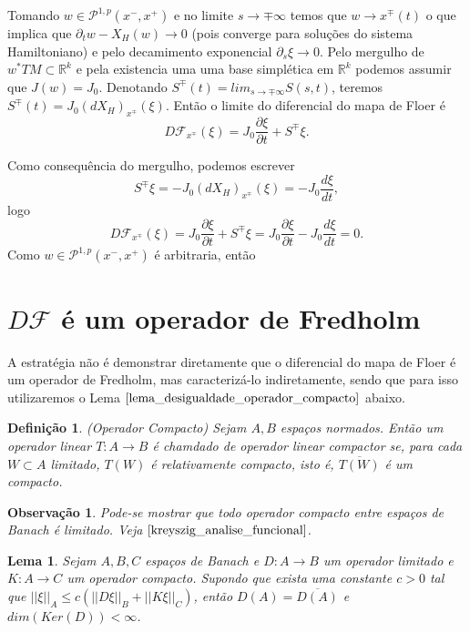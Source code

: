 \documentclass[12pt]{book}
\newtheorem{lema}[teorema]{Lema}
\newtheorem{definicao}[teorema]{Definição}
\newtheorem{observacao}[teorema]{Observação}
\newcommand{\caminhosexponenciaisconectantes}[2]{\mathcal{P}^{1,p}(#1, #2)}
\newcommand{\caminhosexponenciaisconectantespadrao}{\caminhosexponenciaisconectantes{x^{-}}{x^{+}}}
\newcommand{\campohamiltoniano}[1]{X_{H}(#1)}
\newcommand{\derivada}[2]{\frac{d #1}{d #2}}
\newcommand{\derivadaparcial}[2]{\frac{\partial #1}{\partial #2}}
\newcommand{\derivadaparcialabrev}[1]{\partial_{#1}}
\newcommand{\diferencialhamiltoniano}[1]{(dX_{H})_{#1}}
\newcommand{\estruturacomplexa}{J_{0}}
\newcommand{\mapafloer}{\mathcal{F}}
\newcommand{\norma}[1]{||#1||}
\newcommand{\normasubscrito}[2]{\norma{#1}_{#2}}
\newcommand{\pullbackfibradotangente}[2]{#1^{*}T#2}
\newcommand{\pullbackfibradotangenteM}[1]{\pullbackfibradotangente{#1}{M}}
\newcommand{\real}[1]{\mathbb{R}^{#1}}
\begin{document}
	Tomando $w\in \caminhosexponenciaisconectantespadrao$ e no limite $s\to \mp\infty$ temos que $w \to x^{\mp}(t)$ o que implica que $\derivadaparcialabrev{t}w - \campohamiltoniano{w}\to 0$ (pois converge para soluções do sistema Hamiltoniano) e pelo decamimento exponencial $\derivadaparcialabrev{s}\xi \to 0$. Pelo mergulho de $\pullbackfibradotangenteM{w} \subset \real{k}$ e pela existencia uma uma base simplética em $\real{k}$ podemos assumir que $J(w) = \estruturacomplexa$. Denotando $S^{\mp}(t) = lim_{s\to \mp \infty}S(s,t)$, teremos $S^{\mp}(t) = \estruturacomplexa\diferencialhamiltoniano{x^{\mp}}(\xi)$. Então o limite do diferencial do mapa de Floer é
	$$
	D\mapafloer_{x^{\mp}}(\xi) =  \estruturacomplexa\derivadaparcial{\xi}{t}+ S^{\mp}\xi.
	$$
	
	Como consequência do mergulho, podemos escrever
	$$
	S^{\mp}\xi = -\estruturacomplexa\diferencialhamiltoniano{x^{\mp}}(\xi) = -\estruturacomplexa\derivada{\xi}{t},
	$$
	logo
	$$
	D\mapafloer_{x^{\mp}}(\xi) =  \estruturacomplexa\derivadaparcial{\xi}{t}+ S^{\mp}\xi =
	\estruturacomplexa\derivadaparcial{\xi}{t} -\estruturacomplexa\derivada{\xi}{t}
	=0.
	$$
	Como $w \in \caminhosexponenciaisconectantespadrao$ é arbitraria, então 
	
	\section{$D\mapafloer$ é um operador de Fredholm}
	A estratégia não é demonstrar diretamente que o diferencial do mapa de Floer é um operador de Fredholm, mas caracterizá-lo indiretamente, sendo que para isso utilizaremos o Lema $\ref{lema_desigualdade_operador_compacto}$ abaixo.
	
	\begin{definicao}\label{definicao_operador_compacto}
		(Operador Compacto) Sejam $A, B$ espaços normados. Então um operador linear $T:A\to B$ é chamdado de operador linear compactor se, para cada $W \subset A$ limitado, $T(W)$ é relativamente compacto, isto é, $\overline{T(W)} $ é um compacto.
	\end{definicao}
	
	\begin{observacao}\label{observacao_operador_compacto_limitado}
		Pode-se mostrar que todo operador compacto entre espaços de Banach é limitado. Veja $\cite{kreyszig_analise_funcional}$.
	\end{observacao}
	
	\begin{lema}\label{lema_desigualdade_operador_compacto}
		Sejam $A,B,C$ espaços de Banach e $D:A\to B$ um operador limitado e $K:A \to C$ um operador compacto. Supondo que exista uma constante $c>0$ tal que $\normasubscrito{\xi}{A} \leq c(\normasubscrito{D\xi}{B} + \normasubscrito{K\xi}{C})$, então $D(A) = \overline{D(A)}$ e $dim(Ker(D)) <\infty$.
	\end{lema}
	
\end{document}

